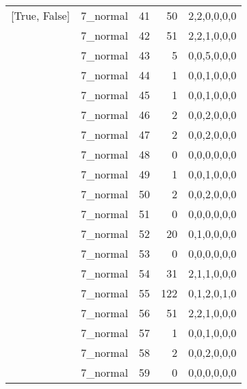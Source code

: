 \begin{tabular}{llrrl}
 [True, False]   & 7\_normal            &            41 &                    50 & 2,2,0,0,0,0   \\
 [True, False]   & 7\_normal            &            42 &                    51 & 2,2,1,0,0,0   \\
 [True, False]   & 7\_normal            &            43 &                     5 & 0,0,5,0,0,0   \\
 [True, False]   & 7\_normal            &            44 &                     1 & 0,0,1,0,0,0   \\
 [True, False]   & 7\_normal            &            45 &                     1 & 0,0,1,0,0,0   \\
 [True, False]   & 7\_normal            &            46 &                     2 & 0,0,2,0,0,0   \\
 [True, False]   & 7\_normal            &            47 &                     2 & 0,0,2,0,0,0   \\
 [True, False]   & 7\_normal            &            48 &                     0 & 0,0,0,0,0,0   \\
 [True, False]   & 7\_normal            &            49 &                     1 & 0,0,1,0,0,0   \\
 [True, False]   & 7\_normal            &            50 &                     2 & 0,0,2,0,0,0   \\
 [True, False]   & 7\_normal            &            51 &                     0 & 0,0,0,0,0,0   \\
 [True, False]   & 7\_normal            &            52 &                    20 & 0,1,0,0,0,0   \\
 [True, False]   & 7\_normal            &            53 &                     0 & 0,0,0,0,0,0   \\
 [True, False]   & 7\_normal            &            54 &                    31 & 2,1,1,0,0,0   \\
 [True, False]   & 7\_normal            &            55 &                   122 & 0,1,2,0,1,0   \\
 [True, False]   & 7\_normal            &            56 &                    51 & 2,2,1,0,0,0   \\
 [True, False]   & 7\_normal            &            57 &                     1 & 0,0,1,0,0,0   \\
 [True, False]   & 7\_normal            &            58 &                     2 & 0,0,2,0,0,0   \\
 [True, False]   & 7\_normal            &            59 &                     0 & 0,0,0,0,0,0   \\

\end{tabular}
